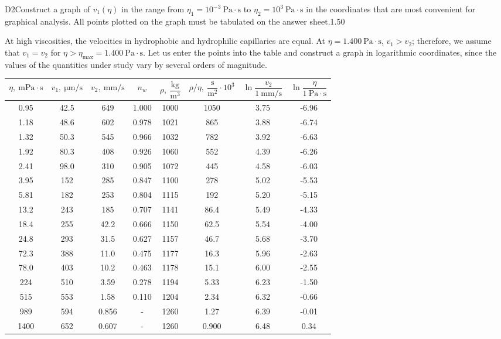\documentclass[11pt,a4paper]{article}
\begin{document}
\begin{solcard}{D2}{Construct a graph of $v_1(\eta)$ in the range from $\eta_1=10^{-3}~\mathrm{Pa}\cdot \mathrm{s}$ to $\eta_2=10^{3}~\mathrm{Pa}\cdot \mathrm{s}$ in the coordinates that are most convenient for graphical analysis. All points plotted on the graph must be tabulated on the answer sheet.}{1.50}

At high viscosities, the velocities in hydrophobic and hydrophilic capillaries are equal. At $\eta=1.400~\mathrm{Pa}\cdot \mathrm{s}$, $v_1>v_2$; therefore, we assume that $v_1=v_2$ for $\eta>\eta_{\text{max}}=1.400~\mathrm{Pa}\cdot \mathrm{s}$. Let us enter the points into the table and construct a graph in logarithmic coordinates, since the values of the quantities under study vary by several orders of magnitude.

\begin{table}[H]
\centering
\begin{tabular}{|c|c|c|c|c|c|c|c|}
\hline
$\eta,~\mathrm{mPa}\cdot\mathrm{s}$ & $v_1,~\mathrm{\mu m}/\mathrm{s}$ & $v_2,~\mathrm{mm}/\mathrm{s}$ & $n_w$ & $\rho, ~\dfrac{\mathrm{kg}}{\mathrm{m}^3}$ & $\rho/\eta, ~\dfrac{\mathrm{s}}{\mathrm{m}^2}\cdot 10^3$ & $\ln\dfrac{v_2}{1~\mathrm{mm}/\mathrm{s}}$ & $\ln\dfrac{\eta}{1~\mathrm{Pa}\cdot \mathrm{s}}$ \\
\hline
0.95 & 42.5 & 649 & 1.000 & 1000 & 1050 & 3.75 & -6.96 \\
1.18 & 48.6 & 602 & 0.978 & 1021 & 865 & 3.88 & -6.74 \\
1.32 & 50.3 & 545 & 0.966 & 1032 & 782 & 3.92 & -6.63 \\
1.92 & 80.3 & 408 & 0.926 & 1060 & 552 & 4.39 & -6.26 \\
2.41 & 98.0 & 310 & 0.905 & 1072 & 445 & 4.58 & -6.03 \\
3.95 & 152 & 285 & 0.847 & 1100 & 278 & 5.02 & -5.53 \\
5.81 & 182 & 253 & 0.804 & 1115 & 192 & 5.20 & -5.15 \\
13.2 & 243 & 185 & 0.707 & 1141 & 86.4 & 5.49 & -4.33 \\
18.4 & 255 & 42.2 & 0.666 & 1150 & 62.5 & 5.54 & -4.00 \\
24.8 & 293 & 31.5 & 0.627 & 1157 & 46.7 & 5.68 & -3.70 \\
72.3 & 388 & 11.0 & 0.475 & 1177 & 16.3 & 5.96 & -2.63 \\
78.0 & 403 & 10.2 & 0.463 & 1178 & 15.1 & 6.00 & -2.55 \\
224 & 510 & 3.59 & 0.278 & 1194 & 5.33 & 6.23 & -1.50 \\
515 & 553 & 1.58 & 0.110 & 1204 & 2.34 & 6.32 & -0.66 \\
989 & 594 & 0.856 & - & 1260 & 1.27 & 6.39 & -0.01 \\
1400 & 652 & 0.607 & - & 1260 & 0.900 & 6.48 & 0.34 \\
\hline
\end{tabular}
\end{table}


\end{solcard}
\end{document}
